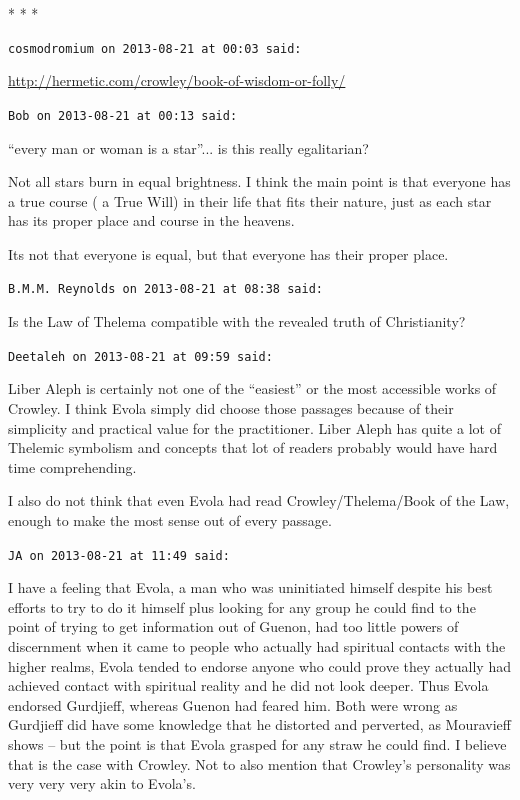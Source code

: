 
\begin{center}* * *\end{center}

\begin{footnotesize}
\begin{sffamily}
\texttt{cosmodromium on 2013-08-21 at 00:03 said:}

\url{http://hermetic.com/crowley/book-of-wisdom-or-folly/}


\hfill

\texttt{Bob on 2013-08-21 at 00:13 said:}

``every man or woman is a star''... is this really egalitarian?

Not all stars burn in equal brightness. I think the main point is that everyone has a true course ( a True Will) in their life that fits their nature, just as each star has its proper place and course in the heavens.

Its not that everyone is equal, but that everyone has their proper place.

\hfill

\texttt{B.M.M. Reynolds on 2013-08-21 at 08:38 said:}

Is the Law of Thelema compatible with the revealed truth of Christianity?

\hfill

\texttt{Deetaleh on 2013-08-21 at 09:59 said:}

Liber Aleph is certainly not one of the ``easiest'' or the most accessible works of Crowley. I think Evola simply did choose those passages because of their simplicity and practical value for the practitioner. Liber Aleph has quite a lot of Thelemic symbolism and concepts that lot of readers probably would have hard time comprehending.

I also do not think that even Evola had read Crowley/Thelema/Book of the Law, enough to make the most sense out of every passage.

\hfill

\texttt{JA on 2013-08-21 at 11:49 said:}

I have a feeling that Evola, a man who was uninitiated himself despite his best efforts to try to do it himself plus looking for any group he could find to the point of trying to get information out of Guenon, had too little powers of discernment when it came to people who actually had spiritual contacts with the higher realms, Evola tended to endorse anyone who could prove they actually had achieved contact with spiritual reality and he did not look deeper. Thus Evola endorsed Gurdjieff, whereas Guenon had feared him. Both were wrong as Gurdjieff did have some knowledge that he distorted and perverted, as Mouravieff shows -- but the point is that Evola grasped for any straw he could find. I believe that is the case with Crowley. Not to also mention that Crowley's personality was very very very akin to Evola's.


\end{sffamily}
\end{footnotesize}
